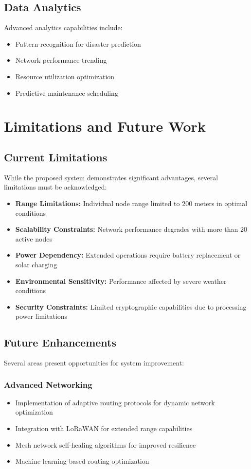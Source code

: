 \documentclass[conference]{IEEEtran}
\begin{document}
\subsection{Data Analytics}

Advanced analytics capabilities include:

\begin{itemize}
\item Pattern recognition for disaster prediction
\item Network performance trending
\item Resource utilization optimization
\item Predictive maintenance scheduling
\end{itemize}

\section{Limitations and Future Work}

\subsection{Current Limitations}

While the proposed system demonstrates significant advantages, several limitations must be acknowledged:

\begin{itemize}
\item \textbf{Range Limitations:} Individual node range limited to 200 meters in optimal conditions
\item \textbf{Scalability Constraints:} Network performance degrades with more than 20 active nodes
\item \textbf{Power Dependency:} Extended operations require battery replacement or solar charging
\item \textbf{Environmental Sensitivity:} Performance affected by severe weather conditions
\item \textbf{Security Constraints:} Limited cryptographic capabilities due to processing power limitations
\end{itemize}

\subsection{Future Enhancements}

Several areas present opportunities for system improvement:

\subsubsection{Advanced Networking}
\begin{itemize}
\item Implementation of adaptive routing protocols for dynamic network optimization
\item Integration with LoRaWAN for extended range capabilities
\item Mesh network self-healing algorithms for improved resilience
\item Machine learning-based routing optimization
\end{itemize}
\end{document}

